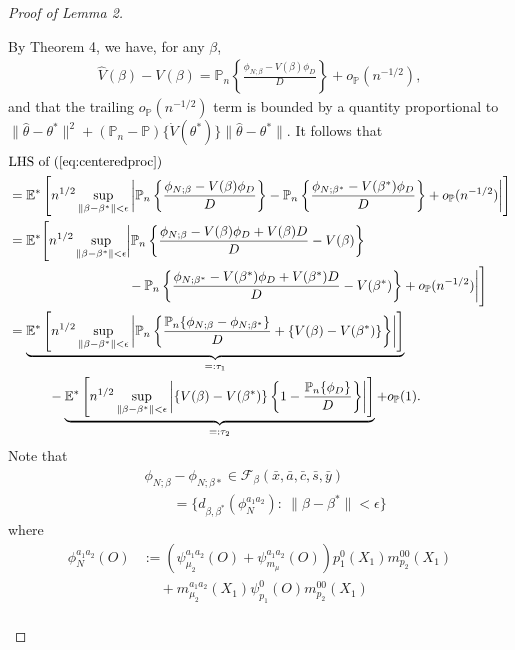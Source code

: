 \documentclass{article}
\newcommand{\wh}{\widehat}
\newcommand{\pr}{\mathbb{P}}
\begin{document}
\begin{proof}[Proof of Lemma 2]
\begin{enumerate}
		By Theorem 4, we have, for any $\beta$,
		\begin{gather*}
			\wh V(\beta) - V(\beta) = \pr_n \left\{ \frac{\phi_{N;\beta} - V(\beta)\phi_{D}}{D} \right\} + o_{\pr}(n^{-1/2}),
		\end{gather*}
		and that the trailing $o_\pr(n^{-1/2})$ term is bounded by a quantity proportional to $\|\hat\theta - \theta^*\|^2 + (\pr_n - \pr)\{ \dot V(\theta^*) \} \|\hat\theta-\theta^*\|$.
		It follows that
		\begin{align*}
			&\text{LHS of }(\ref{eq:centeredproc}) \\
			&= \mathbb E^*\left[ n^{1/2} \sup_{\|\beta - \beta^*\| < \epsilon} \left| 
			  \pr_n\left\{ \frac{\phi_{N; \beta} - V(\beta)\phi_D}{D} \right\} -
			  \pr_n\left\{ \frac{\phi_{N; \beta^*} - V(\beta^*)\phi_D}{D} \right\} + o_{\pr}(n^{-1/2})
			  \right| \right] \\
			&= \mathbb E^*\Biggl[ n^{1/2} \sup_{\|\beta - \beta^*\| < \epsilon} \biggl| 
			  \pr_n\left\{ \frac{\phi_{N; \beta} - V(\beta)\phi_D + V(\beta)D}{D} - V(\beta) \right\} \\
			  &\qquad\qquad\qquad\qquad\quad-
			  \pr_n\left\{ \frac{\phi_{N; \beta^*} - V(\beta^*)\phi_D + V(\beta^*)D}{D} - V(\beta^*) \right\} 
			   + o_{\pr}(n^{-1/2}) \biggr| \Biggr]  \\
			&= \underbrace{ 
			  \mathbb E^*\left[ n^{1/2} \sup_{\|\beta - \beta^*\| < \epsilon} \left| 
			  \pr_n\left\{ \frac{\pr_n\{ \phi_{N; \beta} - \phi_{N; \beta^*} \}}{D} + \{ V(\beta) - V(\beta^*) \} \right\} \right| \right] }_{=:\tau_1} \\
			  &\qquad\quad- \underbrace{
			  \mathbb E^*\left[ n^{1/2} \sup_{\|\beta - \beta^*\| < \epsilon} \left|
			  \left\{ V(\beta) - V(\beta^*) \right\} \left\{ 1 - \frac{\pr_n\{ \phi_D \}}{D} \right\}
			  \right| \right] }_{=:\tau_2} 
			  + o_{\pr}(1).
		\end{align*}
		Note that
		\begin{align*}
			&\phi_{N;\beta} - \phi_{N;\beta*} \in \mathcal F_{\beta}(\bar x, \bar a, \bar c, \bar s, \bar y)\\
			&\qquad=\Biggl\{
			  d_{\beta,\beta^*}( \phi_N^{a_1a_2} )
			:~ \|\beta-\beta^*\| < \epsilon \Biggr\}
		\end{align*}
		where
		\begin{align*}
			\phi_N^{a_1a_2}(O) 
			&:= (\psi_{\mu_2}^{a_1a_2}(O) + \psi_{m_{\mu}}^{a_1a_2}(O))p_1^0(X_1)m_{p_2}^{00}(X_1) \\
			&\;\quad+ m_{\mu_2}^{a_1a_2}(X_1) \psi_{p_1}^0(O) m_{p_2}^{00}(X_1) \\

\end{align*}
\end{enumerate}
\end{proof}
\end{document}
